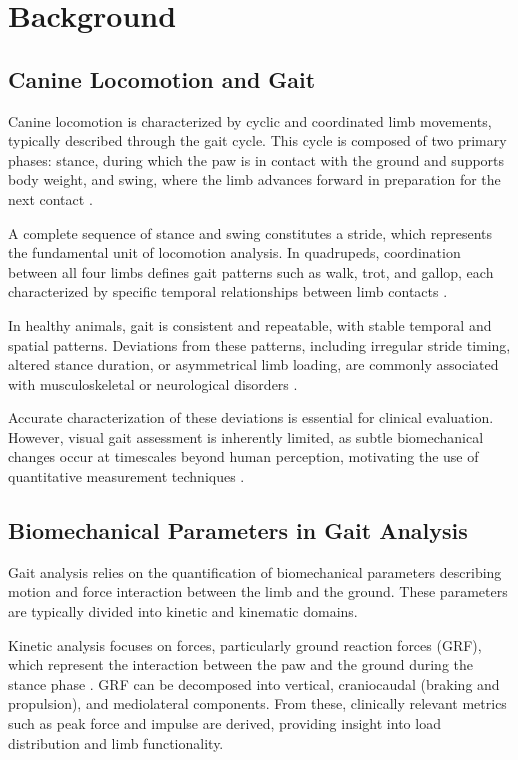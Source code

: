 \chapter{Background}
\label{chapter:background}

\section{Canine Locomotion and Gait}

Canine locomotion is characterized by cyclic and coordinated limb movements, typically described through the gait cycle. This cycle is composed of two primary phases: stance, during which the paw is in contact with the ground and supports body weight, and swing, where the limb advances forward in preparation for the next contact \cite{Jenkins2018, Zhang2022}.

A complete sequence of stance and swing constitutes a stride, which represents the fundamental unit of locomotion analysis. In quadrupeds, coordination between all four limbs defines gait patterns such as walk, trot, and gallop, each characterized by specific temporal relationships between limb contacts \cite{Zhang2022}.

In healthy animals, gait is consistent and repeatable, with stable temporal and spatial patterns. Deviations from these patterns, including irregular stride timing, altered stance duration, or asymmetrical limb loading, are commonly associated with musculoskeletal or neurological disorders \cite{Blattler2024}. 

Accurate characterization of these deviations is essential for clinical evaluation. However, visual gait assessment is inherently limited, as subtle biomechanical changes occur at timescales beyond human perception, motivating the use of quantitative measurement techniques \cite{McLaughlin2001}.

\section{Biomechanical Parameters in Gait Analysis}

Gait analysis relies on the quantification of biomechanical parameters describing motion and force interaction between the limb and the ground. These parameters are typically divided into kinetic and kinematic domains.

Kinetic analysis focuses on forces, particularly ground reaction forces (GRF), which represent the interaction between the paw and the ground during the stance phase \cite{McLaughlin2001}.
GRF can be decomposed into vertical, craniocaudal (braking and propulsion), and mediolateral components. From these, clinically relevant metrics such as peak force and impulse are derived, providing insight into load distribution and limb functionality.

